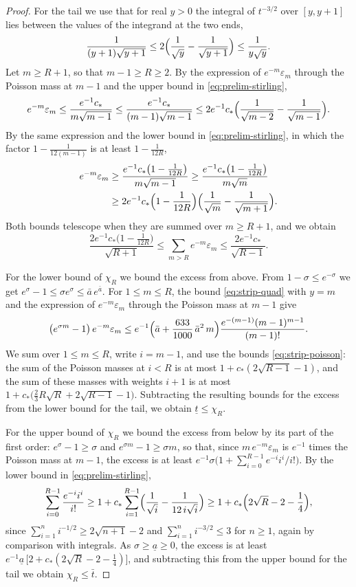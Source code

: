 \documentclass{amsart}
\theoremstyle{definition}
\theoremstyle{remark}
\numberwithin{equation}{section}
\begin{document}
\begin{proof}
For the tail we use that for real $y>0$ the integral of $t^{-3/2}$ over $[y,y+1]$ lies between the values of the integrand at the two ends,
\[
\frac{1}{(y+1)\sqrt{y+1}}\le 2\Bigl(\frac{1}{\sqrt y}-\frac{1}{\sqrt{y+1}}\Bigr)\le\frac{1}{y\sqrt y}.
\]
Let $m\ge R+1$, so that $m-1\ge R\ge 2$. By the expression of $e^{-m}\varepsilon_m$ through the Poisson mass at $m-1$ and the upper bound in \eqref{eq:prelim-stirling},
\[
e^{-m}\varepsilon_m\le\frac{e^{-1}c_\ast}{m\sqrt{m-1}}\le\frac{e^{-1}c_\ast}{(m-1)\sqrt{m-1}}\le 2e^{-1}c_\ast\Bigl(\frac{1}{\sqrt{m-2}}-\frac{1}{\sqrt{m-1}}\Bigr).
\]
By the same expression and the lower bound in \eqref{eq:prelim-stirling}, in which the factor $1-\frac{1}{12(m-1)}$ is at least $1-\frac{1}{12R}$,
\begin{align*}
e^{-m}\varepsilon_m&\ge\frac{e^{-1}c_\ast\bigl(1-\frac{1}{12R}\bigr)}{m\sqrt{m-1}}\ge\frac{e^{-1}c_\ast\bigl(1-\frac{1}{12R}\bigr)}{m\sqrt m}\\
&\ge 2e^{-1}c_\ast\Bigl(1-\frac{1}{12R}\Bigr)\Bigl(\frac{1}{\sqrt m}-\frac{1}{\sqrt{m+1}}\Bigr).
\end{align*}
Both bounds telescope when they are summed over $m\ge R+1$, and we obtain
\[
\frac{2e^{-1}c_\ast\bigl(1-\frac{1}{12R}\bigr)}{\sqrt{R+1}}\le\sum_{m>R}e^{-m}\varepsilon_m\le\frac{2e^{-1}c_\ast}{\sqrt{R-1}}.
\]

For the lower bound of $\chi_R$ we bound the excess from above. From $1-\sigma\le e^{-\sigma}$ we get $e^{\sigma}-1\le\sigma e^{\sigma}\le\bar a\,e^{\bar a}$. For $1\le m\le R$, the bound \eqref{eq:strip-quad} with $y=m$ and the expression of $e^{-m}\varepsilon_m$ through the Poisson mass at $m-1$ give
\[
\bigl(e^{\sigma m}-1\bigr)\,e^{-m}\varepsilon_m\le e^{-1}\Bigl(\bar a+\frac{633}{1000}\,\bar a^{2}\,m\Bigr)\frac{e^{-(m-1)}(m-1)^{m-1}}{(m-1)!}.
\]
We sum over $1\le m\le R$, write $i=m-1$, and use the bounds \eqref{eq:strip-poisson}: the sum of the Poisson masses at $i<R$ is at most $1+c_\ast(2\sqrt{R-1}-1)$, and the sum of these masses with weights $i+1$ is at most $1+c_\ast\bigl(\frac23R\sqrt R+2\sqrt{R-1}-1\bigr)$. Subtracting the resulting bounds for the excess from the lower bound for the tail, we obtain $\underline t\le\chi_R$.

For the upper bound of $\chi_R$ we bound the excess from below by its part of the first order: $e^{\sigma}-1\ge\sigma$ and $e^{\sigma m}-1\ge\sigma m$, so that, since $m\,e^{-m}\varepsilon_m$ is $e^{-1}$ times the Poisson mass at $m-1$, the excess is at least $e^{-1}\sigma\bigl(1+\sum_{i=0}^{R-1}e^{-i}i^i/i!\bigr)$. By the lower bound in \eqref{eq:prelim-stirling},
\[
\sum_{i=0}^{R-1}\frac{e^{-i}i^i}{i!}\ge 1+c_\ast\sum_{i=1}^{R-1}\Bigl(\frac{1}{\sqrt i}-\frac{1}{12\,i\sqrt i}\Bigr)\ge 1+c_\ast\Bigl(2\sqrt R-2-\frac14\Bigr),
\]
since $\sum_{i=1}^{n}i^{-1/2}\ge 2\sqrt{n+1}-2$ and $\sum_{i=1}^{n}i^{-3/2}\le 3$ for $n\ge 1$, again by comparison with integrals. As $\sigma\ge\underline a\ge 0$, the excess is at least $e^{-1}\underline a\,\bigl[2+c_\ast(2\sqrt R-2-\frac14)\bigr]$, and subtracting this from the upper bound for the tail we obtain $\chi_R\le\bar t$.


\end{proof}
\end{document}
